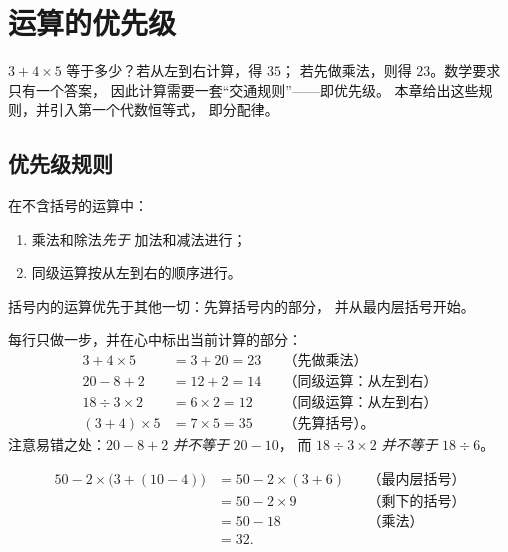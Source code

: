 \chapter{运算的优先级}\label{ch:g7:priorities}

$3 + 4 \times 5$ 等于多少？若从左到右计算，得 $35$；
若先做乘法，则得 $23$。数学要求只有一个答案，
因此计算需要一套“交通规则”——即优先级。
本章给出这些规则，并引入第一个代数恒等式，
即分配律。

\section{优先级规则}

\begin{theorem}[优先级规则]\label{thm:g7:priorities:rules}
在不含括号的运算中：
\begin{enumerate}
  \item 乘法和除法\emph{先于}
        加法和减法进行；
  \item 同级运算按从左到右的顺序进行。
\end{enumerate}
括号内的运算优先于其他一切：先算括号内的部分，
并从最内层括号开始。
\end{theorem}

\begin{example}\label{ex:g7:priorities:basic}
每行只做一步，并在心中标出当前计算的部分：
\begin{align*}
3 + 4 \times 5 &= 3 + 20 = 23
&&\text{（先做乘法）}\\
20 - 8 + 2 &= 12 + 2 = 14
&&\text{（同级运算：从左到右）}\\
18 \div 3 \times 2 &= 6 \times 2 = 12
&&\text{（同级运算：从左到右）}\\
(3 + 4) \times 5 &= 7 \times 5 = 35
&&\text{（先算括号）。}
\end{align*}
注意易错之处：$20 - 8 + 2$ \emph{并不等于} $20 - 10$，
而 $18 \div 3 \times 2$ \emph{并不等于} $18 \div 6$。
\end{example}

\begin{example}[多层括号]\label{ex:g7:priorities:nested}
\begin{align*}
50 - 2 \times \bigl(3 + (10 - 4)\bigr)
&= 50 - 2 \times (3 + 6) && \text{（最内层括号）}\\
&= 50 - 2 \times 9 && \text{（剩下的括号）}\\
&= 50 - 18 && \text{（乘法）}\\
&= 32 .
\end{align*}
\end{example}

